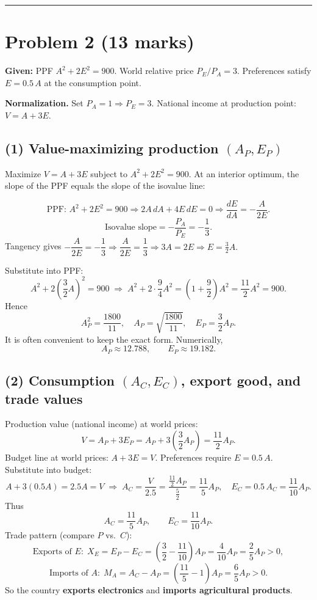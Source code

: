 \documentclass[12pt]{article}
\begin{document}
\hrule
\vspace{0.6em}
\newpage
\section*{Problem 2 (13 marks)}

\textbf{Given:} PPF $A^2 + 2E^2 = 900$. World relative price $P_E/P_A = 3$. Preferences satisfy $E = 0.5\,A$ at the consumption point.

\medskip
\textbf{Normalization.} Set $P_A = 1 \Rightarrow P_E = 3$. National income at production point: $V = A + 3E$.

\subsection*{(1) Value-maximizing production $(A_P,E_P)$}
Maximize $V = A + 3E$ subject to $A^2 + 2E^2 = 900$. At an interior optimum, the slope of the PPF equals the slope of the isovalue line:

\[
\text{PPF: } A^2+2E^2=900 \Rightarrow 2A\,dA + 4E\,dE = 0 \Rightarrow \frac{dE}{dA} = -\frac{A}{2E}.
\]
\[
\text{Isovalue slope} = -\frac{P_A}{P_E} = -\frac{1}{3}.
\]
Tangency gives $-\dfrac{A}{2E} = -\dfrac{1}{3} \Rightarrow \dfrac{A}{2E} = \dfrac{1}{3} \Rightarrow 3A = 2E \Rightarrow E = \frac{3}{2}A.$

Substitute into PPF:
\[
A^2 + 2\!\left(\frac{3}{2}A\right)^{\!2} = 900
\;\Rightarrow\;
A^2 + 2\cdot \frac{9}{4}A^2 = \left(1+\frac{9}{2}\right)A^2 = \frac{11}{2}A^2 = 900.
\]
Hence
\[
A_P^2 = \frac{1800}{11},\quad
A_P = \sqrt{\frac{1800}{11}},\quad
E_P = \frac{3}{2}A_P.
\]
It is often convenient to keep the exact form. Numerically,
\[
A_P \approx 12.788,\qquad E_P \approx 19.182.
\]

\subsection*{(2) Consumption $(A_C,E_C)$, export good, and trade values}
Production value (national income) at world prices:
\[
V = A_P + 3E_P = A_P + 3\!\left(\frac{3}{2}A_P\right) = \frac{11}{2}A_P.
\]
Budget line at world prices: $A + 3E = V$. Preferences require $E=0.5\,A$. Substitute into budget:
\[
A + 3(0.5A) = 2.5A = V \;\Rightarrow\; A_C = \frac{V}{2.5} = \frac{\frac{11}{2}A_P}{\frac{5}{2}} = \frac{11}{5}A_P,\quad
E_C = 0.5\,A_C = \frac{11}{10}A_P.
\]
Thus
\[
A_C = \frac{11}{5}A_P,\qquad E_C = \frac{11}{10}A_P.
\]
Trade pattern (compare $P$ vs.\ $C$):
\[
\text{Exports of }E:\; X_E = E_P - E_C = \left(\frac{3}{2} - \frac{11}{10}\right)A_P = \frac{4}{10}A_P = \frac{2}{5}A_P > 0,
\]
\[
\text{Imports of }A:\; M_A = A_C - A_P = \left(\frac{11}{5}-1\right)A_P = \frac{6}{5}A_P > 0.
\]
So the country \textbf{exports electronics} and \textbf{imports agricultural products}.
\end{document}
